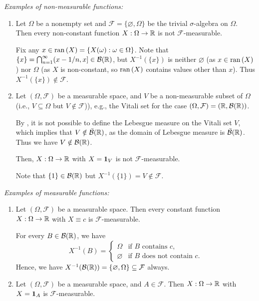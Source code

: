 \begin{enumerate}
\emph{Examples of non-measurable functions:}
\begin{enumerate}[label={(\arabic*)}]
\item Let \(\Omega\) be a nonempty set and
\(\mathcal{F}=\{\varnothing,\Omega\}\) be the trivial \(\sigma\)-algebra on
\(\Omega\). Then every non-constant function \(X:\Omega\to\mathbb{R}\) is
not \(\mathcal{F}\)-measurable.

\begin{pf}
Fix any \(x\in\operatorname{ran}\left(X\right)=\{X(\omega):\omega\in\Omega\}\). Note that
\(\{x\}=\bigcap_{n=1}^{\infty}(x-1/n,x]\in\mathcal{B}(\mathbb{R})\), but
\(X^{-1}(\{x\})\) is neither \(\varnothing\) (as \(x\in\operatorname{ran}\left(X\right)\)) nor
\(\Omega\) (as \(X\) is non-constant, so \(\operatorname{ran}\left(X\right)\) contains values other than
\(x\)). Thus \(X^{-1}(\{x\})\notin\mathcal{F}\).
\end{pf}
\item Let \((\Omega,\mathcal{F})\) be a measurable space, and \(V\) be a
non-measurable subset of \(\Omega\) (i.e., \(V\subseteq \Omega\) but
\(V\notin\mathcal{F}\))), e.g., the Vitali set for the case
\((\Omega,\mathcal{F})=(\mathbb{R},\mathcal{B}(\mathbb{R}))\). \begin{note} By
, it is not possible to define the Lebesgue measure on the
Vitali set \(V\), which implies that \(V\notin\bar{\mathcal{B}}(\mathbb{R})\), as the
domain of Lebesgue measure is \(\bar{\mathcal{B}}(\mathbb{R})\). Thus we have
\(V\notin\mathcal{B}(\mathbb{R})\). \end{note}

Then, \(X:\Omega\to\mathbb{R}\) with \(X=\mathbf{1}_{V}\) is not
\(\mathcal{F}\)-measurable.

\begin{pf}
Note that \(\{1\}\in\mathcal{B}(\mathbb{R})\) but \(X^{-1}(\{1\})=V\notin\mathcal{F}\).
\end{pf}
\end{enumerate}
\emph{Examples of measurable functions:}
\begin{enumerate}[label={(\arabic*)}]
\item Let \((\Omega,\mathcal{F})\) be a measurable space. Then every constant
function \(X:\Omega\to\mathbb{R}\) with \(X\equiv c\) is \(\mathcal{F}\)-measurable.

\begin{pf}
For every \(B\in\mathcal{B}(\mathbb{R})\), we have
\[X^{-1}(B)=\begin{cases}
\Omega&\text{if \(B\) contains \(c\),} \\
\varnothing&\text{if \(B\) does not contain \(c\).}
\end{cases}
\] Hence, we have
\(X^{-1}(\mathcal{B}(\mathbb{R}))=\{\varnothing,\Omega\}\subseteq \mathcal{F}\) always.
\end{pf}
\item Let \((\Omega,\mathcal{F})\) be a measurable space, and
\(A\in\mathcal{F}\). Then \(X:\Omega\to\mathbb{R}\) with \(X=\mathbf{1}_{A}\) is
\(\mathcal{F}\)-measurable.


\end{enumerate}
\end{enumerate}
